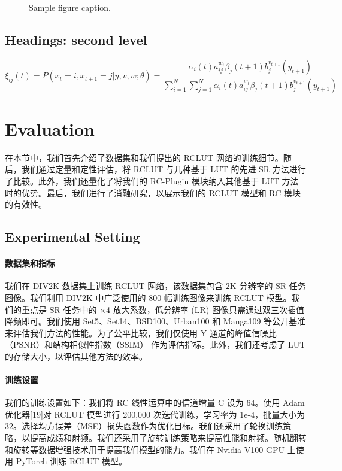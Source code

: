 \documentclass[a4paper]{article}
\begin{document}
\begin{figure}
  \centering
  \fbox{\rule[-.5cm]{4cm}{4cm} \rule[-.5cm]{4cm}{0cm}}
  \caption{Sample figure caption.}
  \label{fig:fig1}
\end{figure}


\subsection{Headings: second level}
\lipsum[5]
\begin{equation}
\xi _{ij}(t)=P(x_{t}=i,x_{t+1}=j|y,v,w;\theta)= {\frac {\alpha _{i}(t)a^{w_t}_{ij}\beta _{j}(t+1)b^{v_{t+1}}_{j}(y_{t+1})}{\sum _{i=1}^{N} \sum _{j=1}^{N} \alpha _{i}(t)a^{w_t}_{ij}\beta _{j}(t+1)b^{v_{t+1}}_{j}(y_{t+1})}}
\end{equation}


\section{Evaluation}
在本节中，我们首先介绍了数据集和我们提出的 RCLUT 网络的训练细节。随后，我们通过定量和定性评估，将 RCLUT 与几种基于 LUT 的先进 SR 方法进行了比较。此外，我们还量化了将我们的 RC-Plugin 模块纳入其他基于 LUT 方法时的优势。最后，我们进行了消融研究，以展示我们的 RCLUT 模型和 RC 模块的有效性。

\subsection{Experimental Setting}

\paragraph{数据集和指标} 我们在 DIV2K 数据集上训练 RCLUT 网络，该数据集包含 2K 分辨率的 SR 任务图像。我们利用 DIV2K 中广泛使用的 800 幅训练图像来训练 RCLUT 模型。我们的重点是 SR 任务中的 ×4 放大系数，低分辨率 (LR) 图像只需通过双三次插值降频即可。我们使用 Set5、Set14、BSD100、Urban100 和 Manga109 等公开基准来评估我们方法的性能。为了公平比较，我们仅使用 Y 通道的峰值信噪比（PSNR）和结构相似性指数（SSIM） 作为评估指标。此外，我们还考虑了 LUT 的存储大小，以评估其他方法的效率。

\paragraph{训练设置} 我们的训练设置如下：我们将 RC 线性运算中的信道增量 C 设为 64。使用 Adam 优化器[19]对 RCLUT 模型进行 200,000 次迭代训练，学习率为 1e-4，批量大小为 32。选择均方误差（MSE）损失函数作为优化目标。我们还采用了轮换训练策略，以提高成绩和射频。我们还采用了旋转训练策略来提高性能和射频。随机翻转和旋转等数据增强技术用于提高我们模型的能力。我们在 Nvidia V100 GPU 上使用 PyTorch 训练 RCLUT 模型。
\end{document}
